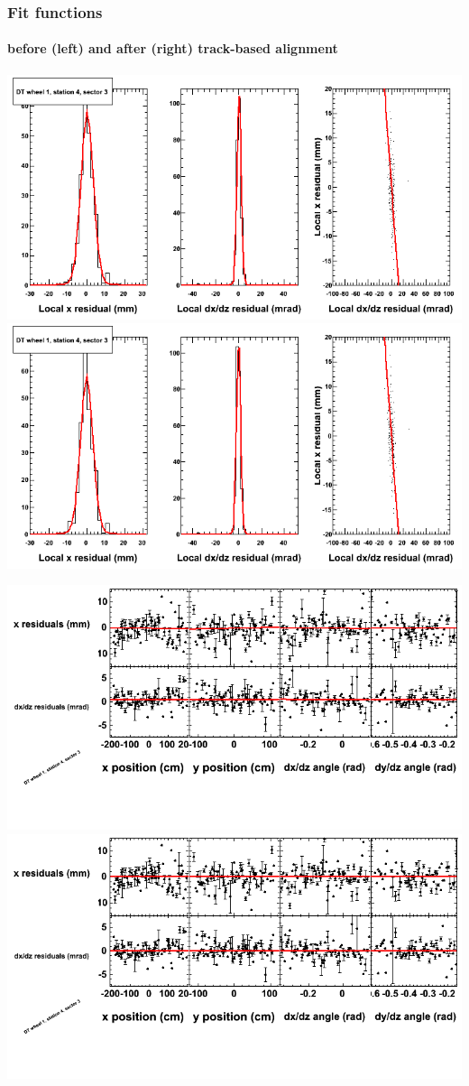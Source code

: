 \documentclass[compress]{beamer}
\begin{document}
\begin{frame}
\frametitle{Fit functions}
\framesubtitle{before (left) and after (right) track-based alignment}
\includegraphics[width=0.5\linewidth]{fitfunctions_re01/MBwhDst4sec03_bellcurves.png} \includegraphics[width=0.5\linewidth]{fitfunctions_re05/MBwhDst4sec03_bellcurves.png}

\includegraphics[width=0.5\linewidth]{fitfunctions_re01/MBwhDst4sec03_polynomials.png} \includegraphics[width=0.5\linewidth]{fitfunctions_re05/MBwhDst4sec03_polynomials.png}
\end{frame}
\end{document}
